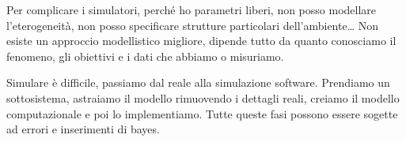 Per complicare i simulatori, perché ho parametri liberi, non posso modellare
l'eterogeneità, non posso specificare strutture particolari dell'ambiente\dots
Non esiste un approccio modellistico migliore, dipende tutto da quanto conosciamo
il fenomeno, gli obiettivi e i dati che abbiamo o misuriamo.

Simulare è difficile, passiamo dal reale alla simulazione software. Prendiamo un 
sottosistema, astraiamo il modello rimuovendo i dettagli reali, creiamo il modello 
computazionale e poi lo implementiamo. Tutte queste fasi possono essere sogette 
ad errori e inserimenti di bayes.